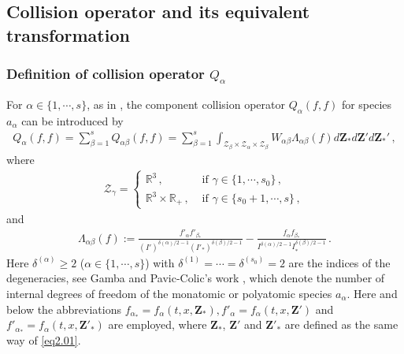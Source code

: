 \documentclass[reqno,11pt]{amsart}
\numberwithin{equation}{section}
\def\R{\mathbb{R}}
\begin{document}
\subsection{Collision operator and its equivalent transformation}

\subsubsection{Definition of collision operator $Q_\alpha$}

For $\alpha \in \{ 1, \cdots, s \}$, as in \cite{N.Bernhoff-2023}, the component collision operator $Q_\alpha (f,f)$ for species $a_\alpha$ can be introduced by
\begin{equation}\label{2.09}
	\begin{aligned}
		Q_\alpha (f,f)
		= \sum \limits_{\beta =1}^s Q_{\alpha \beta } (f, f) = \sum \limits_{\beta =1}^s  \int_{ \mathcal{Z}_\beta \times \mathcal{Z}_\alpha \times \mathcal{Z}_\beta } W_{\alpha \beta } \Lambda_{\alpha \beta } (f) d \mathbf{Z}_* d \mathbf{Z}' d \mathbf{Z}_*' \,, 
	\end{aligned}
\end{equation}
where
\begin{equation}\label{Z-gamma}
	\begin{aligned}
		\mathcal{Z}_\gamma =
		\left\{
		    \begin{aligned}
		    	\R^3 \,, & \textrm{ if } \gamma \in \{ 1, \cdots, s_0 \} \,, \\
		    	\R^3 \times \R_+ \,, & \textrm{ if } \gamma \in \{ s_0 + 1, \cdots, s \} \,,
		    \end{aligned}
		\right.
	\end{aligned}
\end{equation}
and
\begin{equation}
	\begin{aligned}
		\Lambda_{\alpha \beta } (f) := \tfrac{ f'_\alpha f'_{ \beta_* } }{ (I')^{ \delta ( \alpha )/2 - 1 } ( I'_* )^{ \delta ( \beta )/2 - 1 } } - \tfrac{ f_\alpha f_{ \beta_* } }{ I^{ \delta ( \alpha )/2 - 1 } I_*^{ \delta ( \beta )/2 - 1 } } \,.
	\end{aligned}
\end{equation}
Here $\delta^{(\alpha)} \geq 2 $ ($\alpha \in \{ 1, \cdots, s \}$) with $\delta^{(1)}=\cdots =\delta^{(s_0)} =2$ are the indices of the degeneracies, see Gamba and Pavic-Colic's work \cite{Gamba-Pavic-JMP-2023}, which  denote the number of internal degrees
of freedom of the monatomic or polyatomic species $a_\alpha$. Here and below the abbreviations $ f_{\alpha_*} = f_\alpha ( t, x, \mathbf{Z}_* ), f'_\alpha = f_\alpha ( t, x, \mathbf{Z}' ) $ and $ f'_{\alpha_*} = f_\alpha ( t, x, \mathbf{Z}'_* )$ are employed, where $\mathbf{Z}_*$, $\mathbf{Z}'$ and $\mathbf{Z}'_*$ are defined as the same way of \eqref{eq2.01}.
\end{document}
